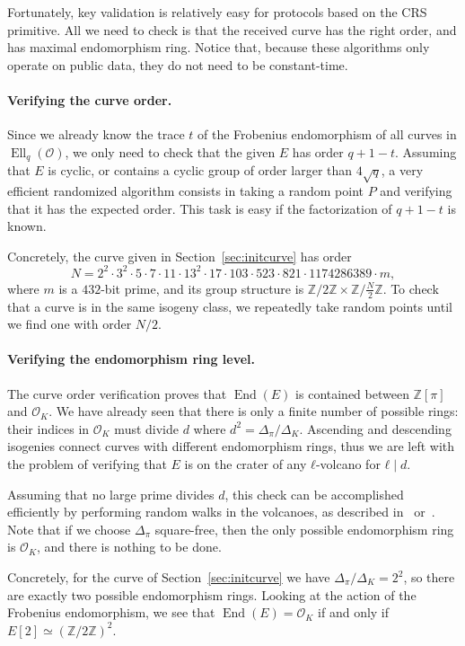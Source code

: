 \documentclass{llncs}
\renewcommand{\O}{\mathcal{O}}
\DeclareMathOperator{\End}{End}
\DeclareMathOperator{\Ell}{Ell}
\begin{document}
Fortunately, key validation is relatively easy for protocols based on
the CRS primitive. All we need to check is that the received curve has
the right order, and has maximal endomorphism ring. Notice that,
because these algorithms only operate on public data, they do not need
to be constant-time.

\paragraph{Verifying the curve order.} Since we already know the trace $t$
of the Frobenius endomorphism of all curves in $\Ell_q(\O)$, 
we only need to check that the given $E$ has order $q+1-t$.
Assuming that $E$ is cyclic, or contains a
cyclic group of order larger than $4\sqrt{q}$, a very efficient
randomized algorithm consists in taking a random point $P$ and
verifying that it has the expected order.  This task is easy if the
factorization of $q+1-t$ is known.

Concretely, the curve given in Section~\ref{sec:initcurve} has order
\[N = 2^2 · 3^2 · 5 · 7 · 11 · 13^2 · 17 · 103 · 523 · 821 ·
  1174286389 · m,\] %
where $m$ is a $432$-bit prime, and its group structure is
$ℤ/2ℤ×ℤ/\frac{N}{2}ℤ$. To check that a curve is in the same isogeny
class, we repeatedly take random points until we find one with order
$N/2$.

\paragraph{Verifying the endomorphism ring level.} 
The curve order verification proves that $\End(E)$ 
is contained between $ℤ[π]$ and $\O_K$. 
We have already seen that there is only a finite number of
possible rings: their indices in $\O_K$ must divide $d$ where $d^2=Δ_π/Δ_K$.
Ascending and descending isogenies connect curves with different endomorphism
rings, thus we are left with the problem of verifying that $E$ is on
the crater of any $ℓ$-volcano for $ℓ\mid d$.

Assuming that no large prime divides $d$, this check can be
accomplished efficiently by performing random walks in the volcanoes,
as described in~\cite[\S4.2]{kohel} or~\cite{fouquet+morain02}. 
Note that if we choose $Δ_π$ square-free, 
then the only possible endomorphism ring is $\O_K$,
and there is nothing to be done.

Concretely, for the curve of Section~\ref{sec:initcurve}
we have $Δ_π/Δ_K=2^2$,
so there are exactly two possible endomorphism rings. Looking at
the action of the Frobenius endomorphism, we see that $\End(E)=\O_K$
if and only if $E[2]≃(ℤ/2ℤ)^2$.
\end{document}
